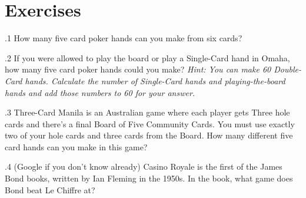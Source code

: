 \section{Exercises}

.1 How many five card poker hands can you make from
six cards?

.2 If you were allowed to play the board or play a
Single-Card hand in Omaha, how many five card poker hands could you
make? \textit{Hint: You can make 60 Double-Card hands. Calculate the
number of Single-Card hands and playing-the-board hands and add those
numbers to 60 for your answer.}

.3 Three-Card Manila is an Australian game where each
player gets Three hole cards and there's a final Board of Five
Community Cards. You must use exactly two of your hole cards and three
cards from the Board. How many different five card hands can you make
in this game?

.4 (Google if you don't know already) Casino Royale
is the first of the James Bond books, written by Ian Fleming in the
1950s. In the book, what game does Bond beat Le Chiffre at?
